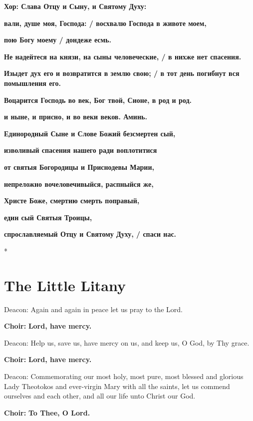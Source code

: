 \documentclass[12pt,a4paper,titlepage]{report}
\begin{document}
\begin{paracol}[1]{2}
	\textbf{Хор: Слава Отцу и Сыну, и Святому Духу:}
	\medskip
	
	\textbf{вали, душе моя, Господа: / восхвалю Господа в животе моем,}
	
	\textbf{пою Богу моему / дондеже есмь.}
	
	\textbf{Не надейтеся на князи, на сыны человеческие, / в нихже нет спасения.}
	
	\textbf{Изыдет дух его и возвратится в землю свою; / в тот день погибнут вся помышления его.}
	
	\textbf{Воцарится Господь во век, Бог твой, Сионе, в род и род.}
	
	\medskip
	\textbf{и ныне, и присно, и во веки веков. Аминь.}
	\medskip
	
	\textbf{Единородный Сыне и Слове Божий безсмертен сый,}
	
	\textbf{изволивый спасения нашего ради воплотитися}
	
	\textbf{от святыя Богородицы и Приснодевы Марии,}
	
	\textbf{непреложно вочеловечивыйся, распныйся же,}
	
	\textbf{Христе Боже, смертию смерть поправый,}
	
	\textbf{един сый Святыя Троицы,}
	
	\textbf{спрославляемый Отцу и Святому Духу, / спаси нас.}
	
	\switchcolumn[0]*
	
	\section*{The Little Litany}
	
	Deacon: Again and again in peace let us pray to the Lord.
	
	\textbf{Choir:} \textbf{Lord, have mercy.}
	
	Deacon: Help us, save us, have mercy on us, and keep us, O God, by Thy grace.
	
	\textbf{Choir:} \textbf{Lord, have mercy.}
	
	Deacon: Commemorating our most holy, most pure, most blessed and glorious Lady Theotokos and ever-virgin Mary with all the saints, let us commend ourselves and each other, and all our life unto Christ our God.
	
	\textbf{Choir:} \textbf{To Thee, O Lord.}
	

\end{paracol}
\end{document}
